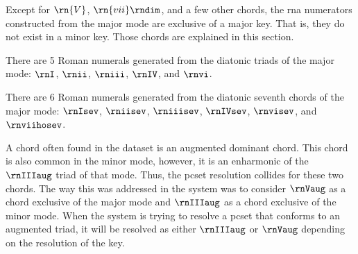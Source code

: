 
Except for $\rn{V}$, $\rn{vii}\rndim$, and a few other
chords, the \gls{rna} numerators constructed from the major
mode are exclusive of a major key. That is, they do not
exist in a minor key. Those chords are explained in this
section.


There are 5 Roman numerals generated from the diatonic
triads of the major mode: $\rnI$, $\rnii$, $\rniii$,
$\rnIV$, and $\rnvi$.



There are 6 Roman numerals generated from the diatonic
seventh chords of the major mode: $\rnIsev$, $\rniisev$,
$\rniiisev$, $\rnIVsev$, $\rnvisev$, and $\rnviihosev$.



A chord often found in the dataset is an augmented dominant
chord. This chord is also common in the minor mode, however,
it is an enharmonic of the $\rnIIIaug$ triad of that mode.
Thus, the \gls{pcset} resolution collides for these two
chords. The way this was addressed in the system was to
consider $\rnVaug$ as a chord exclusive of the major mode and
$\rnIIIaug$ as a chord exclusive of the minor mode. When the
system is trying to resolve a \gls{pcset} that conforms to
an augmented triad, it will be resolved as either $\rnIIIaug$
or $\rnVaug$ depending on the resolution of the key. 
